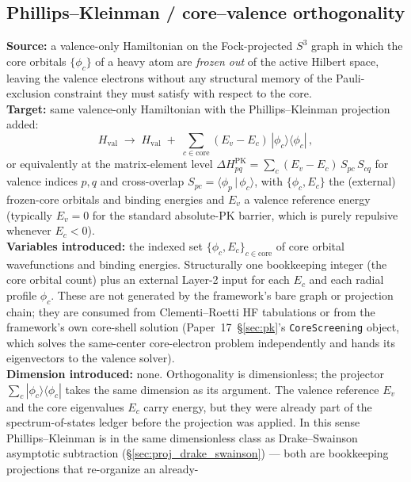 \subsection{Phillips--Kleinman / core--valence orthogonality}
\label{sec:proj_phillips_kleinman}
\textbf{Source:} a valence-only Hamiltonian on the Fock-projected $S^3$
graph in which the core orbitals $\{\phi_c\}$ of a heavy atom are
\emph{frozen out} of the active Hilbert space, leaving the valence
electrons without any structural memory of the Pauli-exclusion
constraint they must satisfy with respect to the core.\\
\textbf{Target:} same valence-only Hamiltonian with the Phillips--Kleinman
projection added:
\begin{equation*}
  H_\text{val} \;\longrightarrow\; H_\text{val}
  \;+\; \sum_{c \in \text{core}} (E_v - E_c)\,
  |\phi_c\rangle\langle\phi_c|\,,
\end{equation*}
or equivalently at the matrix-element level
$\Delta H_{pq}^\text{PK} = \sum_c (E_v - E_c)\,S_{pc}\,S_{cq}$ for
valence indices $p,q$ and cross-overlap $S_{pc} = \langle\phi_p\,
|\,\phi_c\rangle$, with $\{\phi_c, E_c\}$ the (external) frozen-core
orbitals and binding energies and $E_v$ a valence reference energy
(typically $E_v = 0$ for the standard absolute-PK barrier, which is
purely repulsive whenever $E_c < 0$).\\
\textbf{Variables introduced:} the indexed set
$\{\phi_c, E_c\}_{c \in \text{core}}$ of core orbital wavefunctions
and binding energies.  Structurally one bookkeeping integer (the
core orbital count) plus an external Layer-2 input for each $E_c$ and
each radial profile $\phi_c$.  These are not generated by the
framework's bare graph or projection chain; they are consumed from
Clementi--Roetti HF tabulations or from the framework's own core-shell
solution (Paper~17~\S\ref{sec:pk}'s \texttt{CoreScreening} object,
which solves the same-center core-electron problem independently and
hands its eigenvectors to the valence solver).\\
\textbf{Dimension introduced:} none.  Orthogonality is dimensionless;
the projector $\sum_c |\phi_c\rangle\langle\phi_c|$ takes the same
dimension as its argument.  The valence reference $E_v$ and the
core eigenvalues $E_c$ carry energy, but they were already part of the
spectrum-of-states ledger before the projection was applied.  In this
sense Phillips--Kleinman is in the same dimensionless class as
Drake--Swainson asymptotic subtraction (\S\ref{sec:proj_drake_swainson})
--- both are bookkeeping projections that re-organize an already-
